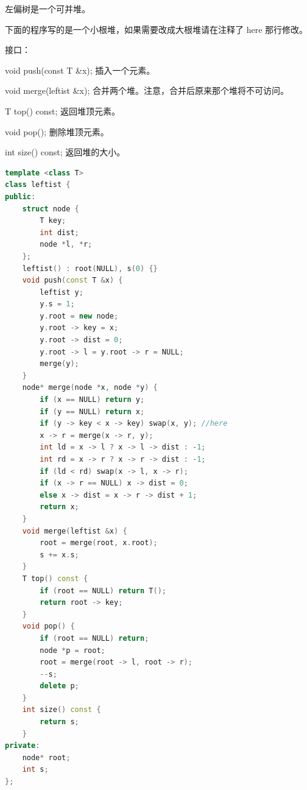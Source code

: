 \documentclass{article}
\begin{document}
左偏树是一个可并堆。

下面的程序写的是一个小根堆，如果需要改成大根堆请在注释了 here 那行修改。

接口：

void push(const T \&x); 插入一个元素。

void merge(leftist \&x); 合并两个堆。注意，合并后原来那个堆将不可访问。

T top() const; 返回堆顶元素。

void pop(); 删除堆顶元素。

int size() const; 返回堆的大小。

\begin{lstlisting}[language=C++]
template <class T>
class leftist {
public:
    struct node {
        T key;
        int dist;
        node *l, *r;
    };
    leftist() : root(NULL), s(0) {}
    void push(const T &x) {
        leftist y;
        y.s = 1;
        y.root = new node;
        y.root -> key = x;
        y.root -> dist = 0;
        y.root -> l = y.root -> r = NULL;
        merge(y);
    }
    node* merge(node *x, node *y) {
        if (x == NULL) return y;
        if (y == NULL) return x;
        if (y -> key < x -> key) swap(x, y); //here
        x -> r = merge(x -> r, y);
        int ld = x -> l ? x -> l -> dist : -1;
        int rd = x -> r ? x -> r -> dist : -1;
        if (ld < rd) swap(x -> l, x -> r);
        if (x -> r == NULL) x -> dist = 0;
        else x -> dist = x -> r -> dist + 1;
        return x;
    }
    void merge(leftist &x) {
        root = merge(root, x.root);
        s += x.s;
    }
    T top() const {
        if (root == NULL) return T();
        return root -> key;
    }
    void pop() {
        if (root == NULL) return;
        node *p = root;
        root = merge(root -> l, root -> r);
        --s;
        delete p;
    }
    int size() const {
        return s;
    }
private:
    node* root;
    int s;
};
\end{lstlisting}
\end{document}
